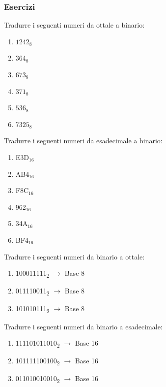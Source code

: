 \documentclass{article}
\begin{document}
\subsubsection*{Esercizi}
Tradurre i seguenti numeri da ottale a binario:
\begin{enumerate}
    \item $1242_{8}$
    \item $364_{8}$
    \item $673_{8}$
    \item $371_{8}$
    \item $536_{8}$
    \item $7325_{8}$
\end{enumerate}
Tradurre i seguenti numeri da esadecimale a binario:
\begin{enumerate}
    \item E3D$_{16}$
    \item AB4$_{16}$
    \item F8C$_{16}$
    \item 962$_{16}$
    \item 34A$_{16}$
    \item BF4$_{16}$
\end{enumerate}
Tradurre i seguenti numeri da binario a ottale:
\begin{enumerate}
    \item 100011111\textsubscript{2} $\rightarrow$ Base 8
    \item 011110011\textsubscript{2} $\rightarrow$ Base 8
    \item 101010111\textsubscript{2} $\rightarrow$ Base 8
\end{enumerate}
Tradurre i seguenti numeri da binario a esadecimale:
\begin{enumerate}
    \item 111101011010\textsubscript{2} $\rightarrow$ Base 16
    \item 101111100100\textsubscript{2} $\rightarrow$ Base 16
    \item 011010010010\textsubscript{2} $\rightarrow$ Base 16
\end{enumerate}
\end{document}
